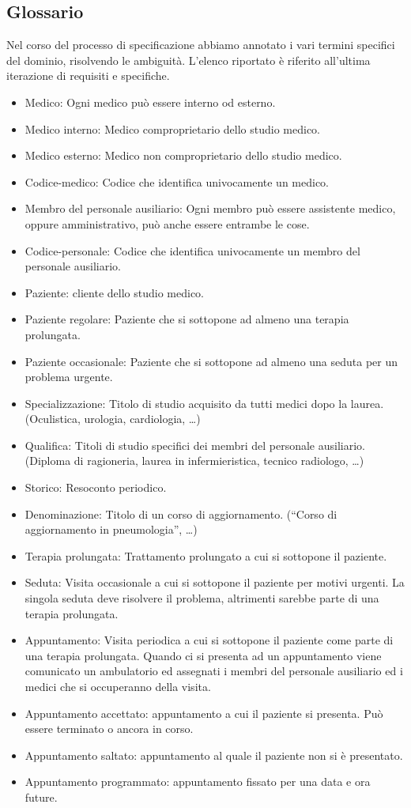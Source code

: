 \documentclass[11pt,a4paper]{article}
\begin{document}
\subsection{Glossario}
Nel corso del processo di specificazione abbiamo annotato i vari termini specifici del
dominio, risolvendo le ambiguità. L'elenco riportato è riferito all'ultima iterazione di
requisiti e specifiche.
\begin{itemize}
\item Medico: Ogni medico può essere interno od esterno.
\item Medico interno: Medico comproprietario dello studio medico.
\item Medico esterno: Medico non comproprietario dello studio medico.
\item Codice-medico: Codice che identifica univocamente un medico.
\item Membro del personale ausiliario: Ogni membro può essere assistente medico, oppure amministrativo, può anche essere entrambe le cose.
\item Codice-personale: Codice che identifica univocamente un membro del personale ausiliario.
\item Paziente: cliente dello studio medico.
\item Paziente regolare: Paziente che si sottopone ad almeno una terapia prolungata.
\item Paziente occasionale: Paziente che si sottopone ad almeno una seduta per un problema urgente.
\item Specializzazione: Titolo di studio acquisito da tutti medici dopo la laurea. (Oculistica, urologia, cardiologia, …)
\item Qualifica: Titoli di studio specifici dei membri del personale ausiliario. (Diploma di ragioneria, laurea in infermieristica, tecnico radiologo, …)
\item Storico: Resoconto periodico.
\item Denominazione: Titolo di un corso di aggiornamento. (“Corso di aggiornamento in pneumologia”, …)
\item Terapia prolungata: Trattamento prolungato a cui si sottopone il paziente.
\item Seduta: Visita occasionale a cui si sottopone il paziente per motivi urgenti. La singola seduta deve risolvere il problema, altrimenti sarebbe parte di una terapia prolungata.
\item Appuntamento: Visita periodica a cui si sottopone il paziente come parte di una terapia prolungata. Quando ci si presenta ad un appuntamento viene comunicato un ambulatorio ed assegnati i membri del personale ausiliario ed i medici che si occuperanno della visita.
\item Appuntamento accettato: appuntamento a cui il paziente si presenta. Può essere terminato o ancora in corso.
\item Appuntamento saltato: appuntamento al quale il paziente non si è presentato.
\item Appuntamento programmato: appuntamento fissato per una data e ora future.
\end{itemize}
\end{document}
